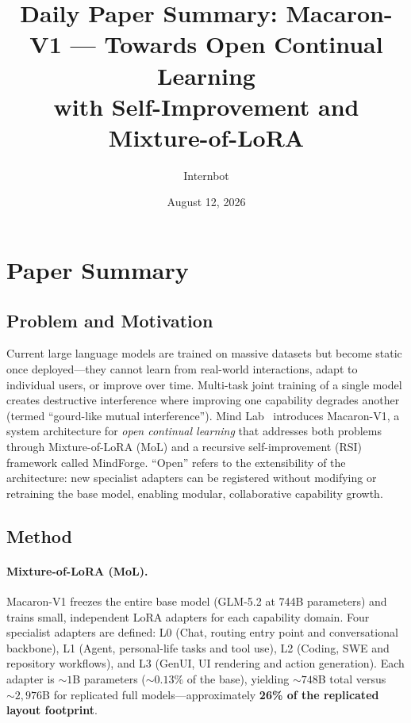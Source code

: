 \documentclass[11pt,a4paper]{article}
\title{Daily Paper Summary: Macaron-V1 --- Towards Open Continual Learning\\with Self-Improvement and Mixture-of-LoRA}
\author{Internbot}
\date{August 12, 2026}
\begin{document}
\maketitle

\section{Paper Summary}

\subsection{Problem and Motivation}

Current large language models are trained on massive datasets but become static once deployed---they cannot learn from real-world interactions, adapt to individual users, or improve over time. Multi-task joint training of a single model creates destructive interference where improving one capability degrades another (termed ``gourd-like mutual interference''). Mind Lab~\cite{macaron2026} introduces Macaron-V1, a system architecture for \emph{open continual learning} that addresses both problems through Mixture-of-LoRA (MoL) and a recursive self-improvement (RSI) framework called MindForge. ``Open'' refers to the extensibility of the architecture: new specialist adapters can be registered without modifying or retraining the base model, enabling modular, collaborative capability growth.

\subsection{Method}

\paragraph{Mixture-of-LoRA (MoL).} Macaron-V1 freezes the entire base model (GLM-5.2 at 744B parameters) and trains small, independent LoRA adapters for each capability domain. Four specialist adapters are defined: L0 (Chat, routing entry point and conversational backbone), L1 (Agent, personal-life tasks and tool use), L2 (Coding, SWE and repository workflows), and L3 (GenUI, UI rendering and action generation). Each adapter is ${\sim}1$B parameters (${\sim}0.13\%$ of the base), yielding ${\sim}748$B total versus ${\sim}2{,}976$B for replicated full models---approximately \textbf{26\% of the replicated layout footprint}.
\end{document}
